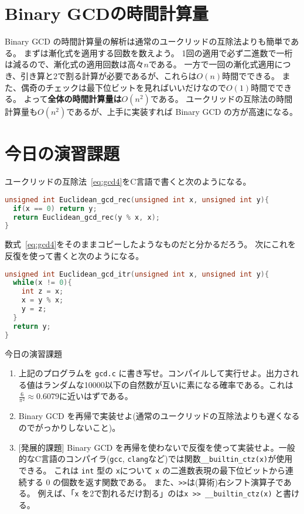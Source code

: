 \documentclass[a4paper,twoside,onecolumn,openany,article,10pt]{memoir}
\theoremstyle{remark}
\begin{document}
\section{Binary GCDの時間計算量}
Binary GCD の時間計算量の解析は通常のユークリッドの互除法よりも簡単である。
まずは漸化式を適用する回数を数えよう。
1回の適用で必ず二進数で一桁は減るので、漸化式の適用回数は高々$n$である。
一方で一回の漸化式適用につき、引き算と2で割る計算が必要であるが、これらは$O(n)$時間でできる。
また、偶奇のチェックは最下位ビットを見ればいいだけなので$O(1)$時間でできる。
よって\textbf{全体の時間計算量は$O(n^2)$}である。
ユークリッドの互除法の時間計算量も$O(n^2)$であるが、上手に実装すれば Binary GCD の方が高速になる。


\section{今日の演習課題}
ユークリッドの互除法~\eqref{eq:gcd4}をC言語で書くと次のようになる。
\begin{lstlisting}[basicstyle=\ttfamily\normalsize,showstringspaces=false,language=C,frame=single]
unsigned int Euclidean_gcd_rec(unsigned int x, unsigned int y){
  if(x == 0) return y;
  return Euclidean_gcd_rec(y % x, x);
}
\end{lstlisting}
数式~\eqref{eq:gcd4}をそのままコピーしたようなものだと分かるだろう。
次にこれを反復を使って書くと次のようになる。
\begin{lstlisting}[basicstyle=\ttfamily\normalsize,showstringspaces=false,language=C,frame=single]
unsigned int Euclidean_gcd_itr(unsigned int x, unsigned int y){
  while(x != 0){
    int z = x;
    x = y % x;
    y = z;
  }
  return y;
}
\end{lstlisting}

\vspace{3em}
\noindent
今日の演習課題
\begin{enumerate}
\item 上記のプログラムを \texttt{gcd.c} に書き写せ。コンパイルして実行せよ。出力される値はランダムな10000以下の自然数が互いに素になる確率である。これは$\frac6{\pi^2}\approx 0.6079$に近いはずである。
\item Binary GCD を再帰で実装せよ(通常のユークリッドの互除法よりも遅くなるのでがっかりしないこと)。
\item {[発展的課題]} Binary GCD を再帰を使わないで反復を使って実装せよ。一般的なC言語のコンパイラ(\texttt{gcc}, \texttt{clang}など)では関数\texttt{\_\_builtin\_ctz(x)}が使用できる。
これは \texttt{int} 型の \texttt{x}について \texttt{x} の二進数表現の最下位ビットから連続する 0 の個数を返す関数である。
また、\texttt{>{}>}は(算術)右シフト演算子である。
例えば、「\texttt{x} を2で割れるだけ割る」のは\texttt{x >{}> \_\_builtin\_ctz(x)} と書ける。
\end{enumerate}
\end{document}
